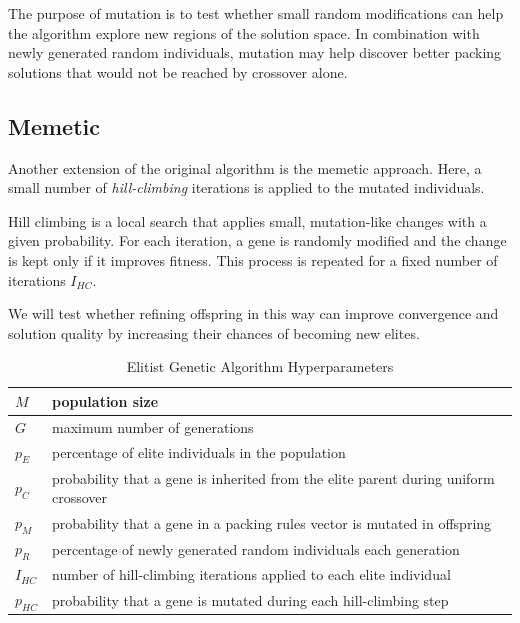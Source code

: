 The purpose of mutation is to test whether small random modifications can help the algorithm explore new regions of the solution space. 
In combination with newly generated random individuals, mutation may help discover better packing solutions that would not be reached by crossover alone.

\subsection{Memetic}

Another extension of the original algorithm is the memetic approach.
Here, a small number of \emph{hill-climbing} iterations is applied to the mutated individuals.

Hill climbing is a local search that applies small, mutation-like changes with a given probability.
For each iteration, a gene is randomly modified and the change is kept only if it improves fitness. 
This process is repeated for a fixed number of iterations $I_{HC}$.

We will test whether refining offspring in this way can improve convergence and solution quality by increasing their chances of becoming new elites.

\begin{table}[htbp]
\centering
\caption{Elitist Genetic Algorithm Hyperparameters}
\label{tab:ega-hyperparameters}
\begin{tabular}{|l|l|}
\hline
$M$ & population size \\ \hline
$G$ & maximum number of generations \\ \hline
$p_E$ & percentage of elite individuals in the population \\ \hline
$p_C$ & probability that a gene is inherited from the elite parent during uniform crossover \\ \hline
$p_M$ & probability that a gene in a packing rules vector is mutated in offspring \\ \hline
$p_R$ & percentage of newly generated random individuals each generation \\ \hline
$I_{HC}$ & number of hill-climbing iterations applied to each elite individual \\ \hline
$p_{HC}$ & probability that a gene is mutated during each hill-climbing step \\ \hline
\end{tabular}
\end{table}

